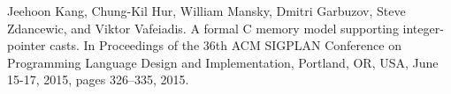 \documentclass[nocopyrightspace]{sigplanconf}
\begin{document}






\begin{thebibliography}{00}
 Jeehoon Kang, Chung-Kil Hur, William Mansky, Dmitri Garbuzov, Steve Zdancewic, and Viktor Vafeiadis. A formal C memory model supporting integer-pointer casts. In Proceedings of the 36th ACM SIGPLAN Conference on Programming Language Design and Implementation, Portland, OR, USA, June 15-17, 2015, pages 326–335, 2015.
\end{thebibliography}
\end{document}
